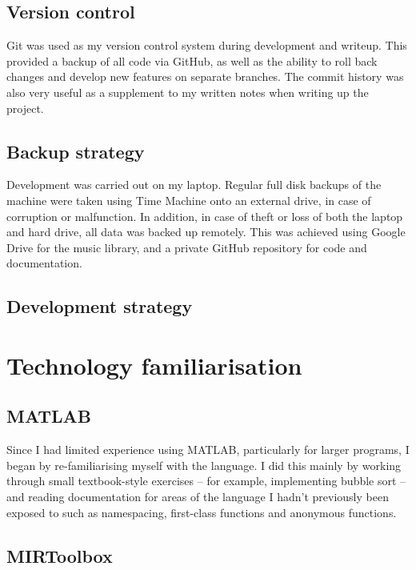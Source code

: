 \documentclass[12pt,a4paper,twoside,openright]{report}
\begin{document}
\subsection{Version control}

Git was used as my version control system during development and writeup. This provided a backup of all code via GitHub, as well as the ability to roll back changes and develop new features on separate branches. The commit history was also very useful as a supplement to my written notes when writing up the project.


\subsection{Backup strategy}

Development was carried out on my laptop. Regular full disk backups of the machine were taken using Time Machine onto an external drive, in case of corruption or malfunction. In addition, in case of theft or loss of both the laptop and hard drive, all data was backed up remotely. This was achieved using Google Drive for the music library, and a private GitHub repository for code and documentation.


\subsection{Development strategy}


\section{Technology familiarisation}

\subsection{MATLAB}

Since I had limited experience using MATLAB, particularly for larger programs, I began by re-familiarising myself with the language. I did this mainly by working through small textbook-style exercises -- for example, implementing bubble sort -- and reading documentation for areas of the language I hadn't previously been exposed to such as namespacing, first-class functions and anonymous functions.

\subsection{MIRToolbox}
\end{document}
